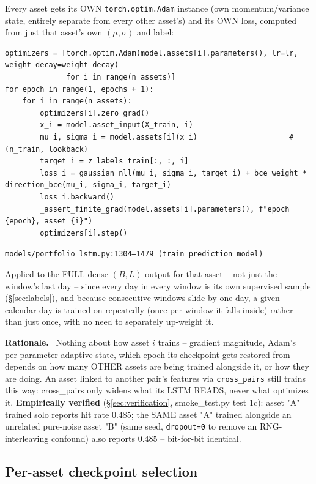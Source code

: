 \documentclass[11pt]{article}
\newcommand{\srcref}[1]{\hfill\textcolor{cmtcolor}{\footnotesize\texttt{#1}}}
\newcommand{\code}[1]{\texttt{\small #1}}
\newcommand{\rationalelabel}{\small\textbf{Rationale.}~}
\begin{document}
Every asset gets its OWN \code{torch.optim.Adam} instance (own momentum/variance state,
entirely separate from every other asset's) and its OWN loss, computed from just that
asset's own $(\mu,\sigma)$ and label:
\begin{lstlisting}[caption={Per-asset training loop - own optimizer, own loss, own backward/step.}, label=lst:trainloop]
optimizers = [torch.optim.Adam(model.assets[i].parameters(), lr=lr, weight_decay=weight_decay)
              for i in range(n_assets)]
for epoch in range(1, epochs + 1):
    for i in range(n_assets):
        optimizers[i].zero_grad()
        x_i = model.asset_input(X_train, i)
        mu_i, sigma_i = model.assets[i](x_i)                     # (n_train, lookback)
        target_i = z_labels_train[:, :, i]
        loss_i = gaussian_nll(mu_i, sigma_i, target_i) + bce_weight * direction_bce(mu_i, sigma_i, target_i)
        loss_i.backward()
        _assert_finite_grad(model.assets[i].parameters(), f"epoch {epoch}, asset {i}")
        optimizers[i].step()
\end{lstlisting}
\srcref{models/portfolio\_lstm.py:1304--1479 (\texttt{train\_prediction\_model})}

Applied to the FULL dense $(B,L)$ output for that asset -- not just the window's last day --
since every day in every window is its own supervised sample (\S\ref{sec:labels}), and
because consecutive windows slide by one day, a given calendar day is trained on repeatedly
(once per window it falls inside) rather than just once, with no need to separately
up-weight it.

\begin{rationale}\rationalelabel
Nothing about how asset $i$ trains -- gradient magnitude, Adam's per-parameter adaptive
state, which epoch its checkpoint gets restored from -- depends on how many OTHER assets are
being trained alongside it, or how they are doing. An asset linked to another pair's
features via \texttt{cross\_pairs} still trains this way: cross\_pairs only widens what its
LSTM READS, never what optimizes it. \textbf{Empirically verified}
(\S\ref{sec:verification}, smoke\_test.py test 1c): asset "A" trained solo reports hit rate
$0.485$; the SAME asset "A" trained alongside an unrelated pure-noise asset "B" (same seed,
\code{dropout=0} to remove an RNG-interleaving confound) also reports $0.485$ -- bit-for-bit
identical.
\end{rationale}

\subsection{Per-asset checkpoint selection}
\end{document}
